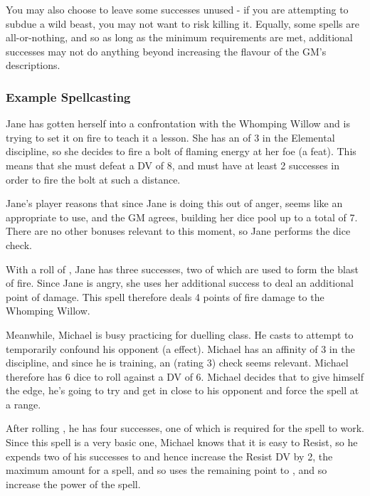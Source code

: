 You may also choose to leave some successes unused - if you are attempting to subdue a wild beast, you may not want to risk killing it. Equally, some spells are all-or-nothing, and so as long as the minimum requirements are met, additional successes may not do anything beyond increasing the flavour of the GM's descriptions. 

\subsubsection{Example Spellcasting}

Jane has gotten herself into a confrontation with the Whomping Willow and is trying to set it on fire to teach it a lesson. She has an  of 3 in the Elemental discipline, so she decides to fire a bolt of flaming energy at her foe (a \levelThree{} feat). This means that she must defeat a DV of 8, and must have at least 2 successes in order to fire the bolt at such a distance. 

Jane's player reasons that since Jane is doing this out of anger,  seems like an appropriate  to use, and the GM agrees, building her dice pool up to a total of 7. There are no other bonuses relevant to this moment, so Jane performs the dice check. 

With a roll of , Jane has three successes, two of which are used to form the blast of fire. Since Jane is angry, she uses her additional success to deal an additional point of damage. This spell therefore deals 4 points of fire damage to the Whomping Willow. 

Meanwhile, Michael is busy practicing for duelling class. He casts  to attempt to temporarily confound his opponent (a \levelOne{} effect). Michael has an affinity of 3 in the  discipline, and since he is training, an  (rating 3) check seems relevant. Michael therefore has 6 dice to roll against a DV of 6. Michael decides that to give himself the edge, he's going to try and get in close to his opponent and force the spell at a  range. 

After rolling , he has four successes, one of which is required for the spell to work. Since this spell is a very basic one, Michael knows that it is easy to Resist, so he expends two of his successes to  and hence increase the Resist DV by 2, the maximum amount for a \levelOne{} spell, and so uses the remaining point to , and so increase the power of the spell.

